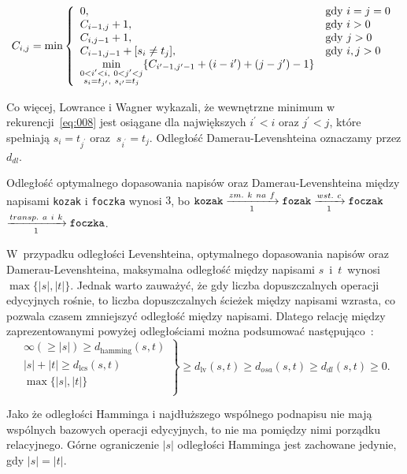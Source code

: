 \documentclass{praca1}
\begin{document}
\begin{equation}
\label{eq:008}
C_{i,j} = \min\left\{
\begin{array}{l l}     
    0, & \text{gdy } i = j = 0\\
    C_{i-1, j} + 1, & \text{gdy } i > 0 \\
    C_{i, j-1} + 1, & \text{gdy } j > 0 \\
    C_{i-1, j-1} + [s_{i}\neq t_{j}], & \text{gdy } i, j > 0 \\
    \min\limits_{\substack{0 < i^{\prime} < i,\ 0 < j^{\prime} < j  \\ s_i = t_{j^{\prime}},\ s_{i^{\prime}} = t_j}} \{C_{i^{\prime}-1, j^{\prime}-1} + (i-i^{\prime}) + (j-j^{\prime}) - 1\}
\end{array}\right.
\end{equation}

Co więcej, Lowrance i Wagner wykazali, że wewnętrzne minimum w rekurencji~\eqref{eq:008} jest osiągane dla największych $i^{\prime} < i$ oraz $j^{\prime} < j$, które spełniają $s_i = t_{j^{\prime}}$ oraz $\ s_{i^{\prime}} = t_j$. Odległość Damerau-Levenshteina oznaczamy przez $d_{dl}$.

\begin{example}
Odległość optymalnego dopasowania napisów oraz Damerau-Levenshteina między napisami \verb|kozak| i \verb|foczka| wynosi $3$, bo $\verb|kozak| \xrightarrow[1]{zm.\ k\ na\ f} \verb|fozak|  \xrightarrow[1]{wst.\ c} \verb|foczak|$ $\xrightarrow[1]{transp.\ a\ i\ k} \verb|foczka|$.
\end{example}

W~przypadku odległości Levenshteina, optymalnego dopasowania napisów oraz Damerau-Levenshteina, maksymalna odległość między napisami $s$~i~$t$~wynosi $\max\{|s|, |t|\}$. Jednak warto zauważyć, że gdy liczba dopuszczalnych operacji edycyjnych rośnie, to liczba dopuszczalnych ścieżek między napisami wzrasta, co pozwala czasem zmniejszyć odległość między napisami. Dlatego relację między zaprezentowanymi powyżej odległościami można podsumować następująco~\cite{Loo2014:stringdist}:
$$
\left. \begin{array}{r}
\infty (\geq |s|) \geq d_{\mathrm{hamming}}(s,t) \\
|s| + |t| \geq d_{\mathrm{lcs}}(s,t) \\
\max\{|s|, |t|\} \\
\end{array} \right \}
\geq d_{\mathrm{lv}}(s,t) \geq d_{osa}(s,t) \geq d_{dl}(s,t) \geq 0.
$$

Jako że odległości Hamminga i najdłuższego wspólnego podnapisu nie mają wspólnych bazowych operacji edycyjnych, to nie ma pomiędzy nimi porządku relacyjnego. Górne ograniczenie $|s|$ odległości Hamminga jest zachowane jedynie, gdy $|s| = |t|$.
\end{document}
